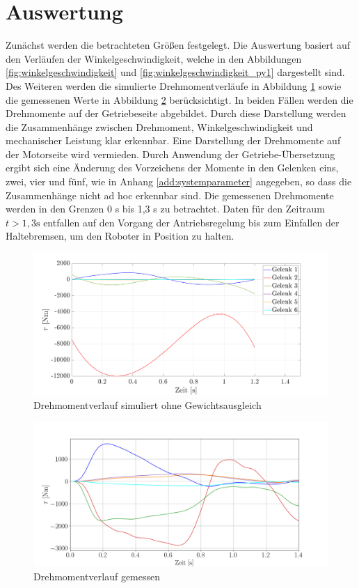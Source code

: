 \section{Auswertung}
Zunächst werden die betrachteten Größen festgelegt. Die Auswertung basiert auf den Verläufen der Winkelgeschwindigkeit, welche in den Abbildungen \ref{fig:winkelgeschwindigkeit} und \ref{fig:winkelgeschwindigkeit_py1} dargestellt sind. Des Weiteren werden die simulierte Drehmomentverläufe in Abbildung \ref{fig:taumat} sowie die gemessenen Werte in Abbildung \ref{fig:tau} berücksichtigt. In beiden Fällen werden die Drehmomente auf der Getriebeseite abgebildet. Durch diese Darstellung werden die Zusammenhänge zwischen Drehmoment, Winkelgeschwindigkeit und mechanischer Leistung klar erkennbar. Eine Darstellung der Drehmomente auf der Motorseite wird vermieden. Durch Anwendung der Getriebe-Übersetzung ergibt sich eine Änderung des Vorzeichens der Momente in den Gelenken eins, zwei, vier und fünf, wie in Anhang \ref{add:systemparameter} angegeben, so dass die Zusammenhänge nicht ad hoc erkennbar sind. Die gemessenen Drehmomente werden in den Grenzen 0 s bis 1,3 s zu betrachtet. Daten für den Zeitraum $t>1,3\text{s}$ entfallen auf den Vorgang der Antriebsregelung bis zum Einfallen der Haltebremsen, um den Roboter in Position zu halten. 
%
\begin{figure}[tbph]
	\centering
	\includegraphics[width=1\linewidth]{images/taumat}
	\caption{Drehmomentverlauf simuliert ohne Gewichtsausgleich}
	\label{fig:taumat}
\end{figure}
%
\begin{figure}[tbph]
	\centering
	\includegraphics[width=1\linewidth]{images/tau}
	\caption{Drehmomentverlauf gemessen}
	\label{fig:tau}
\end{figure}
%
